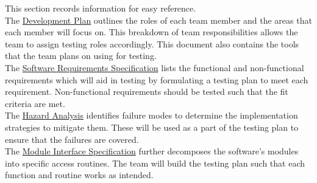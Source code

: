 \documentclass[12pt, titlepage]{article}
\begin{document}
This section records information for easy reference. \\


\noindent The \href{https://github.com/stanreee/sign-language-learning/blob/main/docs/DevelopmentPlan/DevelopmentPlan.pdf}{Development Plan} outlines the roles of each team member and the areas that each member will focus on. This breakdown of team responsibilities allows the team to assign testing roles accordingly. This document also contains the tools that the team plans on using for testing.\\


\noindent The \href{https://github.com/stanreee/sign-language-learning/blob/main/docs/SRS/SRS.pdf}{Software Requirements Specification} lists the functional and non-functional requirements which will aid in testing by formulating a testing plan to meet each requirement. Non-functional requirements should be tested such that the fit criteria are met.\\


\noindent The \href{https://github.com/stanreee/sign-language-learning/blob/main/docs/HazardAnalysis/HazardAnalysis.pdf}{Hazard Analysis} identifies failure modes to determine the implementation strategies to mitigate them. These will be used as a part of the testing plan to ensure that the failures are covered.\\


\noindent The \href{https://github.com/stanreee/sign-language-learning/blob/main/docs/Design/SoftDetailedDes/MIS.pdf}{Module Interface Specification} further decomposes the software's modules into specific access routines. The team will build the testing plan such that each function and routine works as intended.
\end{document}
